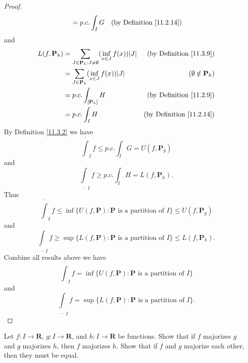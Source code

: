 \begin{proof}
\begin{align*}
                           & = p.c. \int_I G                                                               & \text{(by Definition \ref{11.2.14})}
    \end{align*}
    and
    \begin{align*}
        L(f, \mathbf{P}_h) & = \sum_{J \in \mathbf{P}_h : J \neq \emptyset} (\inf_{x \in J} f(x)) \abs*{J} & \text{(by Definition \ref{11.3.9})}  \\
                           & = \sum_{J \in \mathbf{P}_h} (\inf_{x \in J} f(x)) \abs*{J}                    & (\emptyset \notin \mathbf{P}_h)      \\
                           & = p.c. \int_{[\mathbf{P}_h]} H                                                & \text{(by Definition \ref{11.2.9})}  \\
                           & = p.c. \int_I H                                                               & \text{(by Definition \ref{11.2.14})}
    \end{align*}
    By Definition \ref{11.3.2} we have
    \[
        \overline{\int}_I f \leq p.c. \int_I G = U(f, \mathbf{P}_g)
    \]
    and
    \[
        \underline{\int}_I f \geq p.c. \int_I H = L(f, \mathbf{P}_h).
    \]
    Thus
    \[
        \overline{\int}_I f \leq \inf \{U(f, \mathbf{P}) : \mathbf{P} \text{ is a partition of } I\} \leq U(f, \mathbf{P}_g)
    \]
    and
    \[
        \underline{\int}_I f \geq \sup \{L(f, \mathbf{P}) : \mathbf{P} \text{ is a partition of } I\} \leq L(f, \mathbf{P}_h).
    \]
    Combine all results above we have
    \[
        \overline{\int}_I f = \inf \{U(f, \mathbf{P}) : \mathbf{P} \text{ is a partition of } I\}
    \]
    and
    \[
        \underline{\int}_I f = \sup \{L(f, \mathbf{P}) : \mathbf{P} \text{ is a partition of } I\}.
    \]
\end{proof}

\exercisesection

\begin{exercise}\label{ex 11.3.1}
    Let \(f : I \to \mathbf{R}\), \(g : I \to \mathbf{R}\), and \(h : I \to \mathbf{R}\) be functions.
    Show that if \(f\) majorizes \(g\) and \(g\) majorizes \(h\), then \(f\) majorizes \(h\).
    Show that if \(f\) and \(g\) majorize each other, then they must be equal.
\end{exercise}


